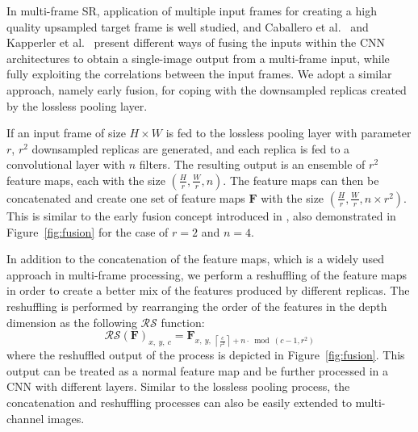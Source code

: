 \documentclass[10pt,twocolumn,letterpaper]{article}
\begin{document}

In multi-frame SR, application of multiple input frames for creating a high quality upsampled target frame is well
studied, and Caballero et al.~\cite{caballero2017} and Kapperler et al.~\cite{kappeler2016} present different ways of
fusing the inputs within the CNN architectures to obtain a single-image output from a multi-frame input, while fully
exploiting the correlations between the input frames. We adopt a similar approach, namely early fusion, for coping
with the downsampled replicas created by the lossless pooling layer.

If an input frame of size $H \times W$ is fed to the lossless pooling layer with parameter $r$, $r^2$ 
downsampled replicas are generated, and each replica is fed to a convolutional layer with $n$ filters. The resulting
output is an ensemble of $r^2$ feature maps, each with the size $(\frac{H}{r}, \frac{W}{r}, n)$. The feature
maps can then be concatenated and create one set of feature maps $\mathbf{F}$ with the size $(\frac{H}{r}, \frac{W}{r}, n \times r^2)$.
This is similar to the early fusion concept introduced in \cite{caballero2017,kappeler2016}, also demonstrated
in Figure~\ref{fig:fusion} for the case of $r=2$ and $n=4$.

In addition to the concatenation of the feature maps, which is a widely used approach in multi-frame processing, we 
perform a reshuffling of the feature maps in order to create a better mix of the features produced by different replicas.
The reshuffling is performed by rearranging the order of the features in the depth dimension as the following $\mathcal{RS}$
function:
\begin{equation}
\label{eq:reshuffling}
{\mathcal{RS}(\mathbf{F})}_{x,\ y,\ c} = {\mathbf{F}}_{x,\ y,\ \left \lceil \frac{c}{r^2} \right \rceil + n \cdot \bmod(c-1, r^2)} 
\end{equation}
where the reshuffled output of the process is depicted in Figure~\ref{fig:fusion}. This output can be treated
as a normal feature map and be further processed in a CNN with different layers. Similar to the lossless pooling
process, the concatenation and reshuffling processes can also be easily extended to multi-channel images.
\end{document}
